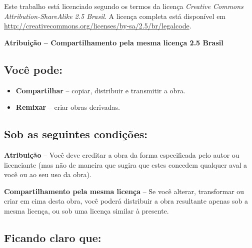 

\thispagestyle{empty}


Este trabalho está licenciado segundo os termos da licença \emph{Creative Commons Attribution-ShareAlike 2.5 Brasil}. A licença completa está disponível em \url{http://creativecommons.org/licenses/by-sa/2.5/br/legalcode}.

\begin{center}

  \large{\textbf{Atribuição -- Compartilhamento pela mesma licença 2.5 Brasil}}
\end{center}

\subsection*{Você pode:}

\noindent
\begin{itemize}
\item \textbf{Compartilhar} -- copiar, distribuir e transmitir a obra.
\item \textbf{Remixar} -- criar obras derivadas.
\end{itemize}

\subsection*{Sob as seguintes condições:}

\vspace{1em}
\noindent
\parbox{1.5cm}{}
\parbox{10.5cm}{\textbf{Atribuição} -- Você deve creditar a obra da forma especificada pelo autor ou licenciante (mas não de maneira que sugira que estes concedem qualquer aval a você ou ao seu uso da obra).}
      
\vspace{1em}
\noindent
\parbox{1.5cm}{}
\parbox{10.5cm}{\textbf{Compartilhamento pela mesma licença} -- Se você alterar, transformar ou criar em cima desta obra, você poderá distribuir a obra resultante apenas sob a mesma licença, ou sob uma licença similar à presente.}

\subsection*{Ficando claro que:}

